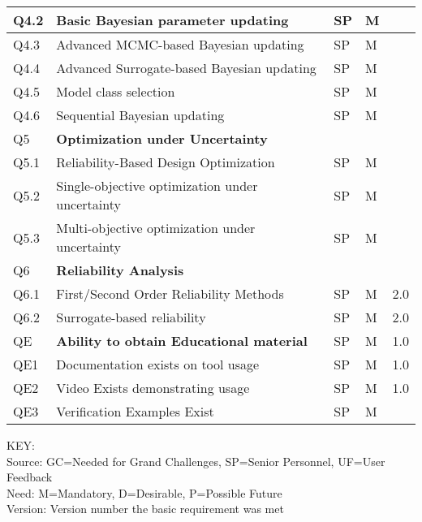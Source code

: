 \begin{longtable}{| p{} | p{} | p{} | p{} |  p{} |}
	Q4.2 & Basic Bayesian parameter updating & SP & M &  \\ \hline
	Q4.3 & Advanced MCMC-based Bayesian updating & SP & M & \\ \hline
	Q4.4 & Advanced Surrogate-based Bayesian updating & SP & M &  \\ \hline
	Q4.5 & Model class selection & SP & M &  \\ \hline
	Q4.6 & Sequential Bayesian updating & SP & M &  \\ \hhline{=====}
	Q5 & \textbf{Optimization under Uncertainty} &  &  & \\ \hline
	Q5.1 & Reliability-Based Design Optimization & SP & M &  \\ \hline
	Q5.2 & Single-objective optimization under uncertainty & SP & M &  \\ \hline
	Q5.3 & Multi-objective optimization under uncertainty & SP & M &  \\ \hhline{=====}
	Q6 & \textbf{Reliability Analysis} &  &  & \\ \hline
	Q6.1 & First/Second Order Reliability Methods & SP & M & 2.0 \\ \hline
	Q6.2 & Surrogate-based reliability & SP & M & 2.0 \\ \hline
    QE & \textbf{Ability to obtain Educational material} &  SP &  M & 1.0  \\ \hline
    QE1 & Documentation exists on tool usage & SP & M & 1.0 \\ \hline
    QE2 & Video Exists demonstrating usage & SP & M & 1.0 \\ \hline
    QE3 & Verification Examples Exist & SP & M &   \\ \hline
	\bottomrule
\end{longtable}

\noindent
KEY:\\
Source: GC=Needed for Grand Challenges, SP=Senior Personnel, UF=User Feedback \\
Need: M=Mandatory, D=Desirable, P=Possible Future \\
Version: Version number the basic requirement was met 
